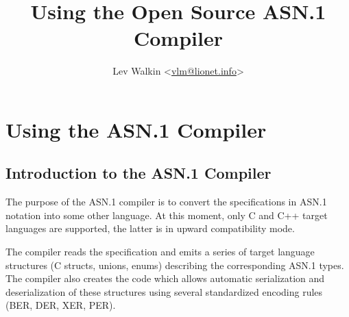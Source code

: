 \documentclass[english,oneside,12pt]{book}
\begin{document}
\title{Using the Open Source ASN.1 Compiler}


\author{Lev Walkin <\href{mailto:vlm@lionet.info?Subject=asn1c}{vlm@lionet.info}>}

\maketitle
{}


\tableofcontents{}

\pagestyle{headings}


\part{Using the ASN.1 Compiler}


\chapter{Introduction to the ASN.1 Compiler}

The purpose of the ASN.1 compiler is to convert the specifications
in ASN.1 notation into some other language. At this moment, only C
and C++ target languages are supported, the latter is in upward compatibility
mode.

The compiler reads the specification and emits a series of target
language structures (C structs, unions, enums) describing the corresponding
ASN.1 types. The compiler also creates the code which allows automatic
serialization and deserialization of these structures using several
standardized encoding rules (BER, DER, XER, PER).
\end{document}
